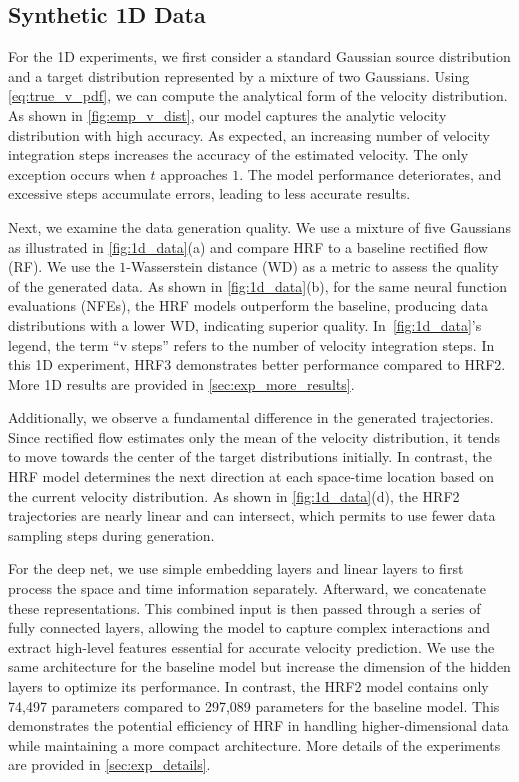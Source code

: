 \subsection{Synthetic 1D Data}
\label{sec:exp:1D}
For the 1D experiments, we first consider a standard Gaussian source distribution and a target distribution represented by a mixture of two Gaussians. Using \cref{eq:true_v_pdf}, we can compute the analytical form of the velocity distribution. As shown in \cref{fig:emp_v_dist}, our model captures the analytic velocity distribution with high accuracy. As expected, an increasing number of velocity integration steps increases the accuracy of the estimated velocity. The only exception occurs when $t$ approaches $1$. The model performance deteriorates, and excessive steps accumulate errors, leading to less accurate results. %

Next, we examine the data generation quality. We use a mixture of five Gaussians as illustrated in \cref{fig:1d_data}(a) and compare HRF to a baseline rectified flow (RF). We use the $1$-Wasserstein distance (WD) as a metric to assess the quality of the generated data. As shown in \cref{fig:1d_data}(b), for the same neural function evaluations (NFEs), the HRF models outperform the baseline, producing data distributions with a lower WD, indicating superior quality. %
In~\cref{fig:1d_data}'s legend, the term ``v steps'' refers to the number of velocity integration steps. In this 1D experiment, HRF3 demonstrates better performance compared to HRF2. More 1D  results are provided in \cref{sec:exp_more_results}. 

Additionally, we observe a fundamental difference in the generated trajectories. %
Since rectified flow estimates only the mean of the velocity distribution, it tends to move towards the center of the target distributions initially. %
In contrast, the HRF model determines the next direction at each space-time location based on the current velocity distribution. As shown in \cref{fig:1d_data}(d), the HRF2 trajectories are nearly linear and can intersect, which permits to use fewer data sampling steps during generation. 

For the deep net, we use simple embedding layers and linear layers to first process the space and time information separately. Afterward, we concatenate these representations. %
This combined input is then passed through a series of fully connected layers, allowing the model to capture complex interactions and extract high-level features essential for accurate velocity prediction. We use the same architecture for the baseline model but increase the dimension of the hidden layers to optimize its performance. In contrast, the HRF2 model %
contains only 74,497 parameters compared to 297,089 parameters for the baseline model. This demonstrates the potential efficiency of HRF in handling higher-dimensional data while maintaining a more compact architecture. More details of the experiments are provided in \cref{sec:exp_details}. 

